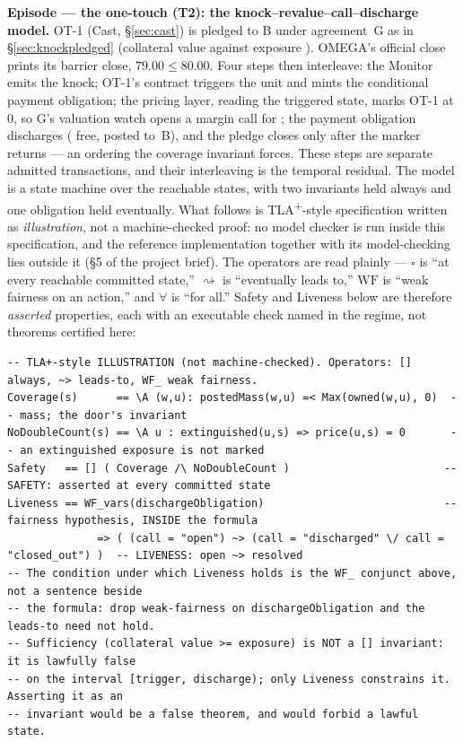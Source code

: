 \medskip\noindent\textbf{Episode --- the one-touch (T2): the knock--revalue--call--discharge
model.}
OT-1 (Cast, \S\ref{sec:cast}) is pledged to B under agreement~G as in
\S\ref{sec:knockpledged} (collateral value  against exposure
). OMEGA's official close prints its barrier close, $79.00 \le 80.00$. Four steps
then interleave: the Monitor emits the knock; OT-1's contract triggers the unit and mints the
conditional payment obligation; the pricing layer, reading the triggered state, marks OT-1 at
$0$, so G's valuation watch opens a margin call for ; the payment obligation
discharges  ( free,  posted to~B), and the
pledge closes only after the marker returns --- an ordering the coverage invariant forces.
These steps are separate admitted transactions, and their interleaving is the temporal
residual. The model is a state machine over the reachable states, with two invariants held
always and one obligation held eventually. What follows is TLA\textsuperscript{+}-style
specification written as \emph{illustration}, not a machine-checked proof: no model checker is
run inside this specification, and the reference implementation together with its
model-checking lies outside it (\S 5 of the project brief). The operators are read plainly ---
$\square$ is ``at every reachable committed state,'' $\rightsquigarrow$ is ``eventually leads
to,'' $\textrm{WF}$ is ``weak fairness on an action,'' and $\forall$ is ``for all.'' Safety and
Liveness below are therefore \emph{asserted} properties, each with an executable check named in
the regime, not theorems certified here:

\begin{lstlisting}
-- TLA+-style ILLUSTRATION (not machine-checked). Operators: [] always, ~> leads-to, WF_ weak fairness.
Coverage(s)      == \A (w,u): postedMass(w,u) =< Max(owned(w,u), 0)  -- mass; the door's invariant
NoDoubleCount(s) == \A u : extinguished(u,s) => price(u,s) = 0       -- an extinguished exposure is not marked
Safety   == [] ( Coverage /\ NoDoubleCount )                        -- SAFETY: asserted at every committed state
Liveness == WF_vars(dischargeObligation)                            -- fairness hypothesis, INSIDE the formula
              => ( (call = "open") ~> (call = "discharged" \/ call = "closed_out") )  -- LIVENESS: open ~> resolved
-- The condition under which Liveness holds is the WF_ conjunct above, not a sentence beside
-- the formula: drop weak-fairness on dischargeObligation and the leads-to need not hold.
-- Sufficiency (collateral value >= exposure) is NOT a [] invariant: it is lawfully false
-- on the interval [trigger, discharge); only Liveness constrains it. Asserting it as an
-- invariant would be a false theorem, and would forbid a lawful state.
\end{lstlisting}

